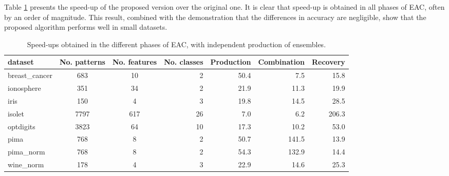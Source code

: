 
Table \ref{tab:validation speedup all} presents the speed-up of the proposed version over the original one.
It is clear that speed-up is obtained in all phases of EAC, often by an order of magnitude.
This result, combined with the demonstration that the differences in accuracy are negligible, show that the proposed algorithm performs well in small datasets.

\begin{table}[h]
\centering
\caption{Speed-ups obtained in the different phases of EAC, with independent production of ensembles.}

\begin{tabular}{lccrrrr}
\toprule
dataset &  No. patterns &  No. features & No. classes & Production & Combination & Recovery \\
\midrule
breast\_cancer &           683 &            10 &           2 &      50.4 &    7.5 &        15.8 \\
ionosphere     &           351 &            34 &           2 &      21.9 &   11.3 &        19.9 \\
iris           &           150 &             4 &           3 &      19.8 &   14.5 &        28.5 \\
isolet         &          7797 &           617 &          26 &       7.0 &    6.2 &       206.3 \\
optdigits      &          3823 &            64 &          10 &      17.3 &   10.2 &        53.0 \\
pima           &           768 &             8 &           2 &      50.7 &  141.5 &        13.9 \\
pima\_norm     &           768 &             8 &           2 &      54.3 &  132.9 &        14.4 \\
wine\_norm     &           178 &             4 &           3 &      22.9 &   14.6 &        25.3 \\
\bottomrule
\end{tabular}

\label{tab:validation speedup all}
\end{table}


